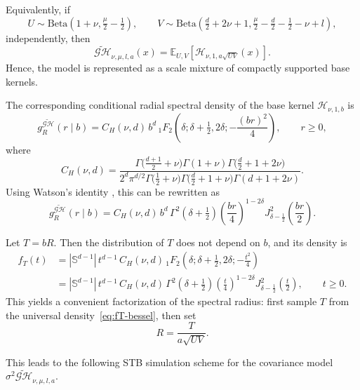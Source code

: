 \documentclass[
  12pt]{article}
\begin{document}
Equivalently, if
\[
U \sim \mathrm{Beta}\!\left(1+\nu,\tfrac{\mu}{2}-\tfrac12\right),
\qquad
V \sim \mathrm{Beta}\!\left(\tfrac d2+2\nu+1,\tfrac{\mu}{2}-\tfrac d2-\tfrac12-\nu+l\right),
\]
independently, then
\[
\widetilde{\mathcal{GH}}_{\nu,\mu,l,a}(x)
=
\mathbb{E}_{U,V}\!\left[\mathcal{H}_{\nu,1,a\sqrt{UV}}(x)\right].
\]
Hence, the model is represented as a scale mixture of compactly supported base kernels.

The corresponding conditional radial spectral density of the base kernel $\mathcal{H}_{\nu,1,b}$ is
\begin{equation}\label{eq:base-spectral}
g^{\widetilde{\mathcal{GH}}}_{R}(r\mid b)
=
C_H(\nu,d)\,b^d\,
{}_1F_2\!\left(\delta;\delta+\tfrac12,2\delta;-\frac{(br)^2}{4}\right),
\qquad r\ge 0,
\end{equation}
where
\begin{equation}\label{eq:CH-corrected}
C_H(\nu,d)=
\frac{
\Gamma\!\bigl(\tfrac{d+1}{2}+\nu\bigr)
\Gamma(1+\nu)
\Gamma\!\bigl(\tfrac d2+1+2\nu\bigr)
}{
2^d\pi^{d/2}
\Gamma\!\bigl(\tfrac12+\nu\bigr)
\Gamma\!\bigl(\tfrac d2+1+\nu\bigr)
\Gamma(d+1+2\nu)
}.
\end{equation}
Using Watson’s identity \citep[p.~147]{Watson}, this can be rewritten as
\begin{equation}\label{eq:base-bessel}
g^{\widetilde{\mathcal{GH}}}_{R}(r\mid b)
=
C_H(\nu,d)\,b^d\,
\Gamma^2\!\left(\delta+\tfrac12\right)
\left(\frac{br}{4}\right)^{1-2\delta}
J_{\delta-\tfrac12}^2\!\left(\frac{br}{2}\right).
\end{equation}

Let $T=bR$. Then the distribution of $T$ does not depend on $b$, and its density is
\begin{equation}\label{eq:fT-bessel}
\begin{aligned}
f_T(t)
&=
|\mathbb{S}^{d-1}|\,t^{d-1}\,C_H(\nu,d)\,
{}_1F_2\!\left(\delta;\delta+\tfrac12,2\delta;-\tfrac{t^2}{4}\right)\\
&=
|\mathbb{S}^{d-1}|\,t^{d-1}\,C_H(\nu,d)\,
\Gamma^2\!\left(\delta+\tfrac12\right)
\left(\tfrac{t}{4}\right)^{1-2\delta}
J_{\delta-\tfrac12}^2\!\left(\tfrac{t}{2}\right),
\qquad t\ge0.
\end{aligned}
\end{equation}
This yields a convenient factorization of the spectral radius:
first sample $T$ from the universal density~\eqref{eq:fT-bessel}, then set
\[
R=\frac{T}{a\sqrt{UV}}.
\]

This leads to the following STB simulation scheme for the covariance model
$\sigma^2\widetilde{\mathcal{GH}}_{\nu,\mu,l,a}$.
\end{document}
